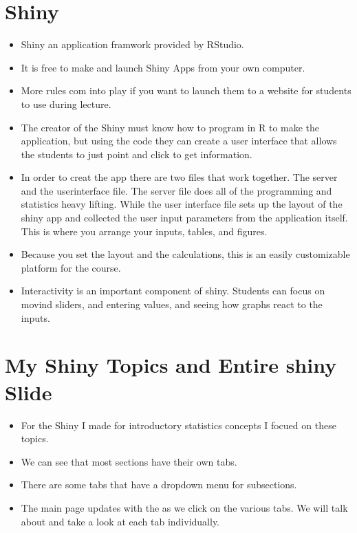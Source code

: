 \documentclass[11pt]{article}
\begin{document}
\section{Shiny}
\begin{itemize}
\item Shiny an application framwork provided by RStudio.
\item It is free to make and launch Shiny Apps from your own computer.
\item More rules com into play if you want to launch them to a website for students to use during lecture.
\item The creator of the Shiny must know how to program in R to make the application, but using the code they can create a user interface that allows the students to just point and click to get information.
\item In order to creat the app there are two files that work together. The server and the userinterface file. The server file does all of the programming and statistics heavy lifting. While the user interface file sets up the layout of the shiny app and collected the user input parameters from the application itself. This is where you arrange your inputs, tables, and figures. 
\item Because you set the layout and the calculations, this is an easily customizable platform for the course. 
\item Interactivity is an important component of shiny. Students can focus on movind sliders, and entering values, and seeing how graphs react to the inputs. 
\end{itemize}

\section{My Shiny Topics and Entire shiny Slide}
\begin{itemize}
\item For the Shiny I made for introductory statistics concepts I focued on these topics. 
\item We can see that most sections have their own tabs.
\item There are some tabs that have a dropdown menu for subsections.
\item The main page updates with the as we click on the various tabs. We will talk about and take a look at each tab individually.
\end{itemize}
\end{document}
